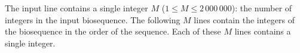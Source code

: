 The input line contains a single integer $M$ ($1 \leq M \leq 2\,000\,000$): the number of integers in the input biosequence. The following $M$ lines contain the integers of the biosequence in the order of the sequence. Each of these $M$ lines contains a single integer. 


